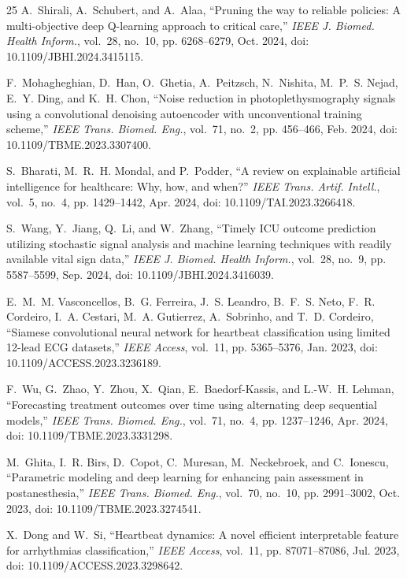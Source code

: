 \documentclass[conference]{IEEEtran}
\begin{document}
\begin{thebibliography}{25}
A.~Shirali, A.~Schubert, and A.~Alaa, ``Pruning the way to reliable policies: A multi-objective deep Q-learning approach to critical care,'' \emph{IEEE J. Biomed. Health Inform.}, vol.~28, no.~10, pp. 6268--6279, Oct. 2024, doi: 10.1109/JBHI.2024.3415115.

F.~Mohagheghian, D.~Han, O.~Ghetia, A.~Peitzsch, N.~Nishita, M.~P.~S. Nejad, E.~Y. Ding, and K.~H. Chon, ``Noise reduction in photoplethysmography signals using a convolutional denoising autoencoder with unconventional training scheme,'' \emph{IEEE Trans. Biomed. Eng.}, vol.~71, no.~2, pp. 456--466, Feb. 2024, doi: 10.1109/TBME.2023.3307400.

S.~Bharati, M.~R.~H. Mondal, and P.~Podder, ``A review on explainable artificial intelligence for healthcare: Why, how, and when?'' \emph{IEEE Trans. Artif. Intell.}, vol.~5, no.~4, pp. 1429--1442, Apr. 2024, doi: 10.1109/TAI.2023.3266418.

S.~Wang, Y.~Jiang, Q.~Li, and W.~Zhang, ``Timely ICU outcome prediction utilizing stochastic signal analysis and machine learning techniques with readily available vital sign data,'' \emph{IEEE J. Biomed. Health Inform.}, vol.~28, no.~9, pp. 5587--5599, Sep. 2024, doi: 10.1109/JBHI.2024.3416039.

E.~M.~M. Vasconcellos, B.~G. Ferreira, J.~S. Leandro, B.~F.~S. Neto, F.~R. Cordeiro, I.~A. Cestari, M.~A. Gutierrez, A.~Sobrinho, and T.~D. Cordeiro, ``Siamese convolutional neural network for heartbeat classification using limited 12-lead ECG datasets,'' \emph{IEEE Access}, vol.~11, pp. 5365--5376, Jan. 2023, doi: 10.1109/ACCESS.2023.3236189.

F.~Wu, G.~Zhao, Y.~Zhou, X.~Qian, E.~Baedorf-Kassis, and L.-W.~H. Lehman, ``Forecasting treatment outcomes over time using alternating deep sequential models,'' \emph{IEEE Trans. Biomed. Eng.}, vol.~71, no.~4, pp. 1237--1246, Apr. 2024, doi: 10.1109/TBME.2023.3331298.

M.~Ghita, I.~R. Birs, D.~Copot, C.~Muresan, M.~Neckebroek, and C.~Ionescu, ``Parametric modeling and deep learning for enhancing pain assessment in postanesthesia,'' \emph{IEEE Trans. Biomed. Eng.}, vol.~70, no.~10, pp. 2991--3002, Oct. 2023, doi: 10.1109/TBME.2023.3274541.

X.~Dong and W.~Si, ``Heartbeat dynamics: A novel efficient interpretable feature for arrhythmias classification,'' \emph{IEEE Access}, vol.~11, pp. 87071--87086, Jul. 2023, doi: 10.1109/ACCESS.2023.3298642.


\end{thebibliography}
\end{document}
